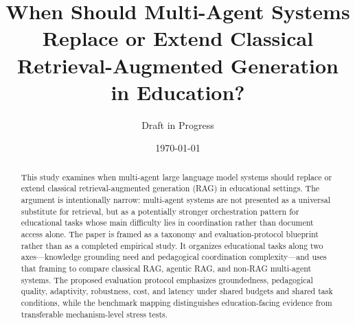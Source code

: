 \documentclass[11pt]{article}
\title{When Should Multi-Agent Systems Replace or Extend Classical Retrieval-Augmented Generation in Education?}
\author{Draft in Progress}
\date{\today}
\begin{document}
\maketitle

\begin{abstract}
This study examines when multi-agent large language model systems should replace or extend classical retrieval-augmented generation (RAG) in educational settings. The argument is intentionally narrow: multi-agent systems are not presented as a universal substitute for retrieval, but as a potentially stronger orchestration pattern for educational tasks whose main difficulty lies in coordination rather than document access alone. The paper is framed as a taxonomy and evaluation-protocol blueprint rather than as a completed empirical study. It organizes educational tasks along two axes---knowledge grounding need and pedagogical coordination complexity---and uses that framing to compare classical RAG, agentic RAG, and non-RAG multi-agent systems. The proposed evaluation protocol emphasizes groundedness, pedagogical quality, adaptivity, robustness, cost, and latency under shared budgets and shared task conditions, while the benchmark mapping distinguishes education-facing evidence from transferable mechanism-level stress tests.
\end{abstract}











\end{document}
